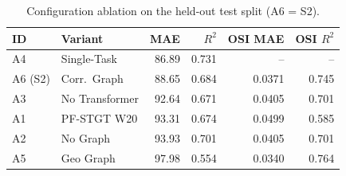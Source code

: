 \begin{table}[!htbp]
\caption{Configuration ablation on the held-out test split (A6 = S2).}
\label{tab:ablation}
\begin{center}
\scriptsize
\setlength{\tabcolsep}{4pt}
\renewcommand{\arraystretch}{1.2}
\begin{tabular}{|l|l|r|r|r|r|}
\hline
\textbf{ID} & \textbf{Variant} & \textbf{MAE} & \textbf{$R^2$} & \textbf{OSI MAE} & \textbf{OSI $R^2$} \\
\hline
A4 & Single-Task & 86.89 & 0.731 & -- & -- \\
A6 (S2) & Corr.\ Graph & 88.65 & 0.684 & 0.0371 & 0.745 \\
A3 & No Transformer & 92.64 & 0.671 & 0.0405 & 0.701 \\
A1 & PF-STGT W20 & 93.31 & 0.674 & 0.0499 & 0.585 \\
A2 & No Graph & 93.93 & 0.701 & 0.0405 & 0.701 \\
A5 & Geo Graph & 97.98 & 0.554 & 0.0340 & 0.764 \\
\hline
\end{tabular}
\end{center}
\end{table}
